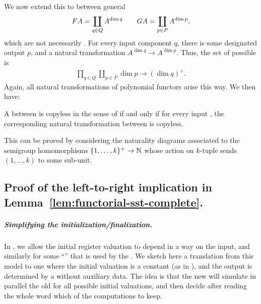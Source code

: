 We now extend this  to  between general 
\begin{align*}
\functor A = \coprod_{q \in Q} A^{\dim q} \qquad 
\functorg A = \coprod_{p \in P} A^{\dim p},
\end{align*}
which are not necessarily . For every input component $q$, there is some designated output  $p$, and a natural transformation $A^{\dim q} \to A^{\dim p}$. Thus, the set of possible  is
\begin{align*}
\prod_{q \in Q} \coprod_{p \in P} \dim p \to (\dim q)^+.
\end{align*}
Again, all natural transformations of polynomial functors arise this way.
We then have:
\begin{claim}
  A  between  is copyless in the sense of  if and only if for every input , the corresponding natural transformation between  is copyless.
\end{claim}
This can be proved by considering the naturality diagrams associated to the
semigroup homomorphisms $\{1,\dots,k\}^+ \to {\mathbb N}$ whose action on $k$-tuple
sends $(1,\dots,k)$ to some sub-unit.


\subsection{Proof of the left-to-right implication in Lemma~\ref{lem:functorial-sst-complete}.}

\subparagraph{Simplifying the initialization/finalization.}

In , we allow the initial register valuation to depend in a  way on the input, and similarly for some \enquote{} that is used by the . We sketch here a translation from this model to one where the initial valuation is a constant (as in ), and the output is determined by a  without auxiliary data. The idea is that the new \functorialsst will simulate in parallel the old \functorialsst for all possible initial valuations, and then decide after reading the whole word which of the computations to keep.

